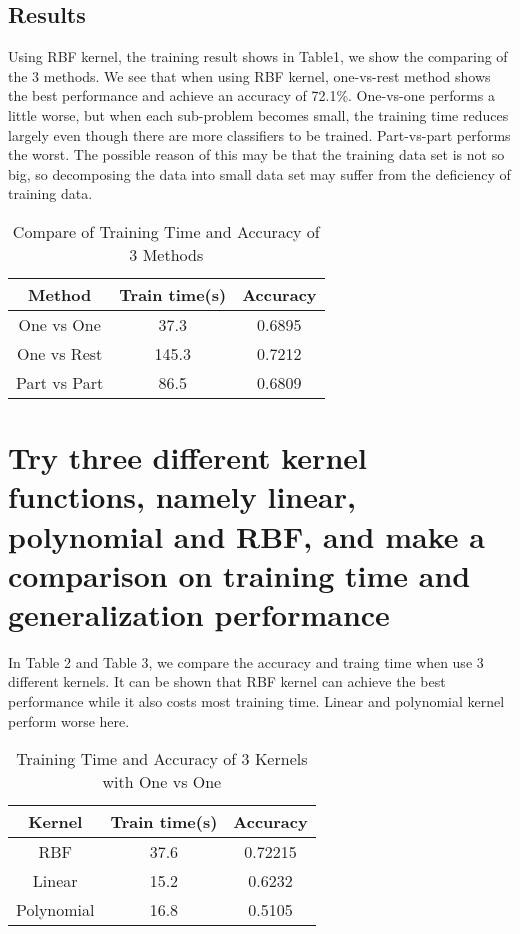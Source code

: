 \documentclass[final,authoryear,3p,times,onecolumn]{elsarticle}
\theoremstyle{definition}
\begin{document}
\subsection{Results}
Using RBF kernel, the training result shows in Table1, we show the comparing of the 3 methods. We see that when using RBF kernel, one-vs-rest method shows the best performance and achieve an accuracy of 72.1\%. One-vs-one performs a little worse, but when each sub-problem becomes small, the training time reduces largely even though there are more classifiers to be trained. Part-vs-part performs the worst. The possible reason of this may be that the training data set is not so big, so decomposing the data into small data set may suffer from the deficiency of training data.
\begin{table}[h]
	\begin{center}
		\caption{Compare of Training Time and Accuracy of 3 Methods}
		\begin{tabular}{|c|c|c|}
			\hline  Method & Train time(s) & Accuracy \\
			\hline One vs One & 37.3 & 0.6895 \\
			\hline One vs Rest & 145.3 & 0.7212 \\
			\hline Part vs Part & 86.5 & 0.6809 \\
			\hline
		\end{tabular}
	\end{center}
\end{table}


\section{Try three different kernel functions, namely linear, polynomial and RBF, and make a comparison on training time and generalization performance}
In Table 2 and Table 3, we compare the accuracy and traing time when use 3 different kernels. It can be shown that RBF kernel can achieve the best performance while it also costs most training time. Linear and polynomial kernel perform worse here.
\begin{table}[h]
	\begin{center}
		\caption{Training Time and Accuracy of 3 Kernels with One vs One}
		\begin{tabular}{|c|c|c|}
			\hline  Kernel & Train time(s) & Accuracy \\
			\hline RBF & 37.6 & 0.72215 \\
			\hline Linear & 15.2 & 0.6232 \\
			\hline Polynomial & 16.8 & 0.5105 \\
			\hline
		\end{tabular}
	\end{center}
\end{table}
\end{document}
